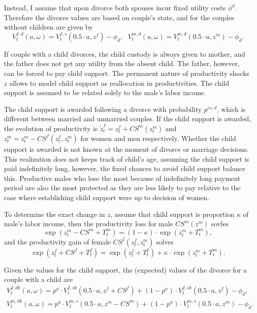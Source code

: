 \documentclass[12pt,letter]{article}
\begin{document}
Instead, I assume that upon divorce both spouses incur fixed utility costs $\phi^d$. Therefore the divorce values are based on couple's state, and for the couples without children are given by 
\begin{equation}
V^{f,d}_t(a,\omega) = V^{f,s}_t(0.5\cdot a,z^f) - \phi_d, \ \ \ V^{m,d}_t(a,\omega) = V^{m,d}_t(0.5\cdot a,z^m) - \phi_d.
\end{equation}

If couple with a child divorces, the child custody is always given to mother, and the father does not get any utility from the absent child. The father, however, can be forced to pay child support. The permanent nature of productivity shocks $z$ allows to model child support as reallocation in productivities. The child support is assumed to be related solely to the male's labor income.

The child support is awarded following a divorce with probability $p^{cs,d}$, which is different between married and unmarried couples. If the child support is awarded, the evolution of productivity is $\tilde{z}^f_{t} = z^f_{t} + CS^m(z^m_t)$ and  $z^m_{t} = z^m_t - CS^f(z^f_t,z^m_t) $ for women and men respectively. Whether the child support is awarded is not known at the moment of divorce or marriage decisions. This realization does not keeps track of child's age, assuming the child support is paid indefinitely long, however, the fixed chances to avoid child support balance this. Productive males who lose the most because of indefinitely long payment period are also the most protected as they are less likely to pay relative to the case where establishing child support were up to decision of women.

To determine the exact change in $z$, assume that child support is proportion $\kappa$ of male's labor income, then the productivity loss for male $CS^m(z^m)$ sovles \[\exp(z^m_t  - CS^m +  T^m_t) = (1-\kappa)\cdot \exp(z^m_t  +  T^m_t),\] and the productivity gain of female $CS^f(z^f_t,z^m_t)$ solves \[\exp(z^f_t + CS^f +  T^f_t) = \exp(z^f_t  +  T^f_t) + \kappa \cdot \exp(z^m_t  +  T^m_t).\] 

Given the values for the child support, the (expected) values of the divorce for a couple with a child are
\begin{align}
V^{f,dk}_t(a,\omega) = p^a\cdot V^{f,sk}_t(0.5\cdot a,z^f + CS^f) + (1-p^a)\cdot V^{f,sk}_t(0.5\cdot a,z^f)  - \phi_d, \\
V^{m,dk}_t(a,\omega) = p^a\cdot V^{m,s}_t(0.5\cdot a,z^m - CS^m) +  (1-p^a)\cdot V^{m,s}_t(0.5\cdot a,z^m) - \phi_d.
\end{align}
\end{document}
